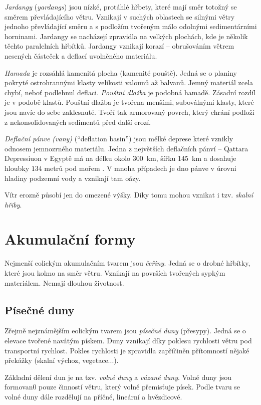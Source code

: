 \emph{Jardangy} (\textit{yardangs}) jsou nízké, protáhlé hřbety, které mají směr totožný se směrem převládajícího větru. Vznikají v suchých oblastech se silnými větry jednoho převládající směru a s podložím tvořeným málo odolnými sedimentárními horninami. Jardangy se nacházejí zpravidla na velkých plochách, kde je několik těchto paralelních hřbítků. Jardangy vznikají korazí -- obrušováním větrem nesených částeček a deflací uvolněného materiálu. 

\emph{Hamada} je rozsáhlá kamenitá plocha (kamenité pouště). Jedná se o planiny pokryté ostrohrannými klasty velikosti valounů až balvanů. Jemný materiál zcela chybí, neboť podlehnul deflaci. \emph{Pouštní dlažba} je podobná hamadě. Zásadní rozdíl je v podobě klastů. Pouštní dlažba je tvořena menšími, suboválnými klasty, které jsou navíc do sebe zaklesnuté. Tvoří tak armorovaný povrch, který chrání podloží z nekonsolidovaných sedimentů před další erozí. 

\emph{Deflační pánve (vany)} (\enquote{deflation basin}) jsou mělké deprese které vznikly odnosem jemnozrného materiálu. Jedna z největších deflačních pánví -- Qattara Depressiuon v Egyptě má na délku okolo \SI{300}{\kilo\metre}, šířku \SI{145}{\kilo\metre} a dosahuje hloubky $134$ metrů pod mořem \parencite{albrittonOriginQattaraDepression1990}. V mnoha případech je dno pánve v úrovni hladiny podzemní vody a vznikají tam oázy. 

Vítr erozně působí jen do omezené výšky. Díky tomu mohou vznikat i tzv. \emph{skalní hřiby}.

\section{Akumulační formy}
Nejmenší eolickým akumulačním tvarem jsou \emph{čeřiny}. Jedná se o drobné hřbítky, které jsou kolmo na směr větru. Vznikají na površích tvořených sypkým materiálem. Nemají dlouhou životnost. 

\subsection{Písečné duny}
Zřejmě nejznámějším eolickým tvarem jsou \emph{písečné duny} (přesypy). Jedná se o elevace tvořené navátým pískem. Duny vznikají díky poklesu rychlosti větru pod transportní rychlost. Pokles rychlosti je zpravidla zapříčiněn přítomností nějaké překážky (skalní výchoz, vegetace...). 

Základní dělení dun je na tzv. \emph{volné duny} a \emph{vázané duny}. Volné duny jsou formovan0 pouze činností větru, který volně přemisťuje písek. Podle tvaru se volné duny dále rozdělují na příčné, lineární a hvězdicové. 

